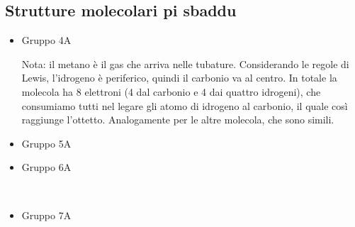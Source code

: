 \subsection{Strutture molecolari pi sbaddu}
\begin{itemize}
    \item Gruppo 4A
    
    
    \qquad
    \qquad
    \qquad
    
    Nota: il metano è il gas che arriva nelle tubature. Considerando le regole di Lewis, l'idrogeno è periferico, quindi il carbonio va al centro. In totale la molecola ha 8 elettroni (4 dal carbonio e 4 dai quattro idrogeni), che consumiamo tutti nel legare gli atomo di idrogeno al carbonio, il quale così raggiunge l'ottetto. Analogamente per le altre molecola, che sono simili.
    \item Gruppo 5A
    
    \qquad
    \qquad
    \qquad 
    \item Gruppo 6A
    
    \qquad
    \qquad
    \qquad \,
    \item Gruppo 7A
    

\end{itemize}
